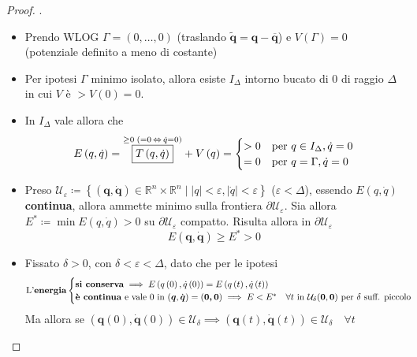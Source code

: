 \documentclass[a4paper,10pt]{article}
\theoremstyle{definition}
\newcommand{\bv}{\boldsymbol} %
\newcommand{\re}{\mathbb{R}} %
\theoremstyle{indentdefinition}
\theoremstyle{indenttheorem}
\theoremstyle{myremark}
\theoremstyle{indentgeneral}
\begin{document}
\begin{proof} .
\begin{itemize}
    \item Prendo WLOG $\Gamma=\left(0,\dots,0\right)$ (traslando $\widetilde{\bv{q}}=\bv{q}-\overline{\bv{q}}$) e $V\left(\Gamma\right)=0$ (potenziale definito a meno di costante)
    \item Per ipotesi  $\Gamma$ minimo isolato, allora esiste $I_{\Delta}$ intorno bucato di $0$ di raggio $\Delta$ in cui
$V$ è $>V\left(0\right)=0$.
    \item  In $I_{\Delta}$ vale
allora che
\[
E\left(q,\dot{q}\right)=\overset{\geq0\;\left(=0\,\Leftrightarrow\,\dot{q}=0\right)}{\boxed{T\left(q,\dot{q}\right)}}+V\left(q\right)=\begin{cases}
>0 & \text{per \ensuremath{q\in I_{\Delta},\dot{q}=0}}\\
=0 & \text{per \ensuremath{q=\Gamma, \dot{q}=0}}
\end{cases}
\]
\item  Preso 
 $\mathcal{U}_{\varepsilon}\coloneqq\left\{ \left(\bv{q},\dot{\bv{q}}\right)\in\re^n\times\re^n\mid\left|q\right|<\varepsilon,\left|\dot{q}\right|<\varepsilon\right\} $
($\varepsilon<\Delta$), essendo $E\left(q,\dot{q}\right)$ \textbf{continua}, allora ammette minimo sulla frontiera $\partial\mathcal{U}_{\varepsilon}$. Sia allora $E^{*}\coloneqq\min E\left(q,\dot{q}\right)>0$
su $\partial\mathcal{U}_{\varepsilon}$ compatto. Risulta allora in $\partial\mathcal{U}_{\varepsilon}$
$$E(\bv{q},\dot{\bv{q}})\ge E^*>0$$ 
\item Fissato  $\delta>0$, con $\delta<\varepsilon<\Delta$, dato che per le ipotesi 
$$\text{L'\textbf{energia}}\begin{cases}
    \text{\textbf{si conserva}} \implies E\left(q\left(0\right),\dot{q}\left(0\right)\right)=E\left(q\left(t\right),\dot{q}\left(t\right)\right) \\
     \text{\textbf{è continua}  e vale $0$ in $(\bv{q},\dot{\bv{q}})=(\bv{0,\bv{0}})$} \implies E<E^{*}\quad\forall t \text{ in $\mathcal{U}_\delta(\bv{0},\bv{0})$ per $\delta$ suff. piccolo}
\end{cases}$$
 Ma allora se $(\bv{q}(0),\dot{\bv{q}}(0))\in\mathcal{U}_\delta\implies (\bv{q}(t),\dot{\bv{q}}(t))\in\mathcal{U}_\delta\quad\forall t$
\end{itemize} 


\end{proof}
\end{document}

